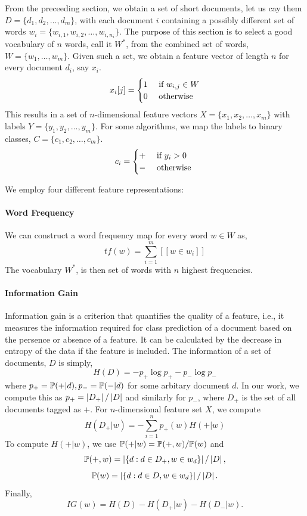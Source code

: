 \documentclass[11pt, letterpaper, conference, final, twocolumn]{ieeeconf}
\begin{document}
From the preceeding section, we obtain a set of short documents, let us cay them $D = \{d_1, d_2, \ldots, d_m\}$, with each document $i$ containing a possibly different set of words $w_{i} = \{w_{i,1}, w_{i, 2}, \ldots, w_{i, n_i} \}$. The purpose of this section is to select a good vocabulary of $n$ words, call it $W^*$, from the combined set of words, $W = \{w_1, \ldots, w_m\}$. Given such a set, we obtain a feature vector of length $n$ for every document $d_i$, say $x_i$.
$$
x_i[j] = \begin{cases}
	1 & \textrm{ if } w_{i,j} \in W \\
	0 & \textrm{ otherwise }
\end{cases}
$$
This results in a set of $n$-dimensional feature vectors $X = \{ x_1, x_2, \ldots, x_m \}$ with labels $Y = \{y_1, y_2, \ldots, y_m \}$. For some algorithms, we map the labels to binary classes, $C = \{c_1, c_2, \ldots, c_m \}$.
$$
c_i = \begin{cases}
	+ & \textrm{ if } y_i > 0 \\
	- & \textrm{ otherwise }
\end{cases}
$$

We employ four different feature representations:
\paragraph{Word Frequency}
\label{ssec:wf}
We can construct a word frequency map for every word $w \in W$ as,
$$
tf(w) = \sum_{i=1}^m [[ w \in w_i ]]
$$
The vocabulary $W^*$, is then set of words with $n$ highest frequencies.

\paragraph{Information Gain}
\label{ssec:ig}
Information gain is a criterion that quantifies the quality of a feature, i.e., it measures the information required for class prediction of a document based on the persence or absence of a feature. It can be calculated by the decrease in entropy of the data if the feature is included. The information of a set of documents, $D$ is simply,
$$
H(D) = -p_+ \log p_+ - p_- \log p_-
$$
where $p_+ = \mathbb{P}(+ | d), p_- = \mathbb{P}(- | d)$ for some arbitary document $d$. In our work, we compute this as $p_+ = \left| D_+ \right|/\left| D \right|$ and similarly for $p_-$, where $D_+$ is the set of all documents tagged as $+$. For $n$-dimensional feature set $X$, we compute
$$
H(D_+ | w) = -\sum_{i=1}^n p_+(w) H(+ | w)
$$
To compute $H(+|w)$, we use $\mathbb{P}(+ | w) = \mathbb{P}(+, w)/ \mathbb{P}(w)$ and 
$$\mathbb{P}(+, w) = \left| \{ d: d \in D_+, w \in w_d \} \right|/\left| D \right|,$$ 
$$\mathbb{P}(w) = \left| \{ d: d \in D, w \in w_d \} \right|/\left| D \right|.$$
Finally,
$$
IG(w) = H(D) - H(D_+ | w) - H(D_{-} | w).
$$
\end{document}
